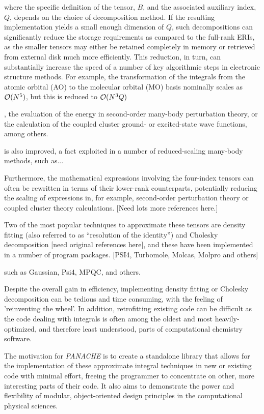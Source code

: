 \documentclass[12pt,letterpaper]{article}
\newcommand{\panache}{\textit{PANACHE}\xspace}
\begin{document}
where the specific definition of the tensor, $B$, and the associated auxiliary
index, $Q$, depends on the choice of decomposition method. If the resulting
implementation yields a small enough dimension of $Q$, such decompositions can
significantly reduce the storage requirements as compared to the full-rank
ERIs, as the smaller tensors may either be retained completely in memory or
retrieved from external disk much more efficiently.  This reduction, in turn,
can substantially increase the speed of a number of key algorithmic steps in
electronic structure methods.  For example, the transformation of the
integrals from the atomic orbital (AO) to the molecular orbital (MO) basis
nominally scales as ${\cal O}(N^5)$, but this is reduced to ${\cal O}(N^3 Q)$

, the evaluation of the energy in second-order many-body perturbation theory, or the calculation of the coupled
cluster ground- or excited-state wave functions, among others.

  is also improved, a fact exploited in a number of
reduced-scaling many-body methods, such as...

Furthermore, the mathematical expressions involving the four-index tensors can
often be rewritten in terms of their lower-rank counterparts, potentially
reducing the scaling of expressions in, for example, second-order perturbation
theory or coupled cluster theory calculations.\cite{Werner:2003a} [Need lots
more references here.]


Two of the most popular techniques to approximate these tensors are density
fitting (also referred to as ``resolution of the identity'') and Cholesky
decomposition [need original references here], and these have been implemented
in a number of program packages.  [PSI4, Turbomole, Molcas, Molpro and others]




such as Gaussian\cite{Gaussian09}, Psi4\cite{Turney:2012a}, MPQC, and
others. 


Despite the overall gain in efficiency, implementing density fitting
or Cholesky decomposition can be tedious and time consuming, with the
feeling of 'reinventing the wheel'. In addition, retrofitting existing
code can be difficult as the code dealing with integrals is often among
the oldest and most heavily-optimized, and therefore least understood,
parts of computational chemistry software.

The motivation for \panache is to create a standalone library that
allows for the implementation of these approximate integral techniques
in new or existing code with minimal effort, freeing the programmer to
concentrate on other, more interesting parts of their code. It also aims
to demonstrate the power and flexibility of modular, object-oriented
design principles in the computational physical sciences.
\end{document}
